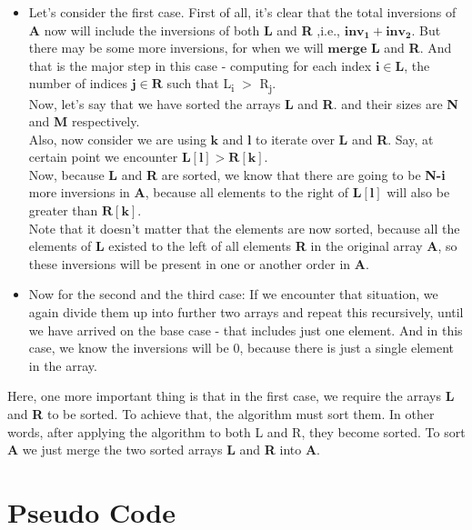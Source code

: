 \documentclass[conference]{IEEEtran}
\begin{document}
\begin{itemize}
    \item Let's consider the first case. First of all, it's clear that the total inversions of \textbf{A} now will include the inversions of both \textbf{L} and \textbf{R} ,i.e., $\bm{inv_1} + \bm{inv_2}$. But there may be some more inversions, for when we will $\bm{merge}$ \textbf{L} and \textbf{R}. And that is the major step in this case - computing for each index $\bm{i \in L}$, the number of indices $\bm{j \in R}$ such that L\textsubscript i $>$ R\textsubscript j.\\
    Now, let's say that we have sorted the arrays \textbf{L} and \textbf{R}. and their sizes are \textbf{N} and \textbf{M} respectively. \\
    Also, now consider we are using $\bm{k}$ and $\bm{l}$ to iterate over \textbf{L} and \textbf{R}. Say, at certain point we encounter $\bm{L[l]} > \bm{R[k]}$.\\
    Now, because \textbf{L} and \textbf{R} are sorted, we know that there are going to be \textbf{N-i} more inversions in \textbf{A}, because all elements to the right of $\bm{L[l]}$ will also be greater than $\bm{R[k]}$.\\
    Note that it doesn't matter that the elements are now sorted, because all the elements of \textbf{L} existed to the left of all elements \textbf{R} in the original array \textbf{A}, so these inversions will be present in one or another order in \textbf{A}.
    \\
    \item Now for the second and the third case: If we encounter that situation, we again divide them up into further two arrays and repeat this recursively, until we have arrived on the base case - that includes just one element. And in this case, we know the inversions will be $0$, because there is just a single element in the array.
\end{itemize}

Here, one more important thing is that in the first case, we require the arrays \textbf{L} and \textbf{R} to be sorted. To achieve that, the algorithm must sort them. In other words, after applying the algorithm to both L and R, they become sorted. To sort \textbf{A} we just merge the two sorted arrays \textbf{L} and \textbf{R} into \textbf{A}.

\section{\textbf{Pseudo Code}}
\end{document}
